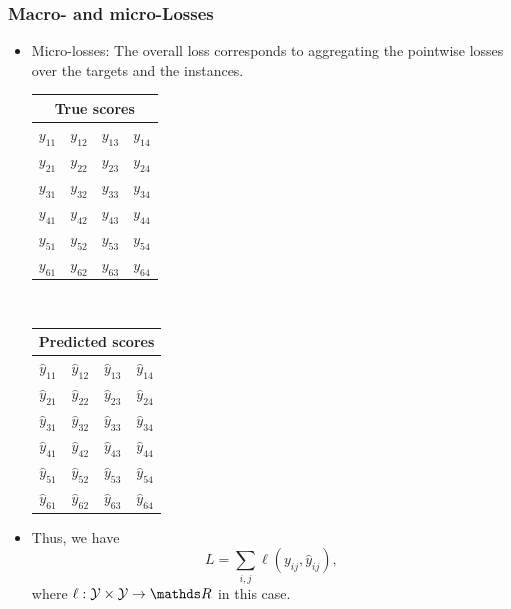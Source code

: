 \documentclass[11pt,compress,t,notes=noshow, xcolor=table]{beamer}
\begin{document}
\begin{frame}
	\frametitle{Macro- and micro-Losses}
	
	\begin{itemize}
		\item<1-> Micro-losses: The overall loss corresponds to aggregating the pointwise losses over the targets and the instances.
		
		\begin{center}
			\begin{tabular}{|c|c|c|c|}
				\multicolumn{4}{c}{True scores} \\
				\hline
				\color{putred}$y_{11}$ & \color{putred}$y_{12}$ & \color{putred}$y_{13}$ & \color{putred}$y_{14}$ \\
				\color{putred}$y_{21}$ & \color{putred}$y_{22}$ & \color{putred}$y_{23}$ & \color{putred}$y_{24}$ \\
				\color{putred}$y_{31}$ & \color{putred}$y_{32}$ & \color{putred}$y_{33}$ & \color{putred}$y_{34}$ \\
				\color{putred}$y_{41}$ & \color{putred}$y_{42}$ & \color{putred}$y_{43}$ & \color{putred}$y_{44}$ \\
				\color{putred}$y_{51}$ & \color{putred}$y_{52}$ & \color{putred}$y_{53}$ & \color{putred}$y_{54}$ \\
				\color{putred}$y_{61}$ & \color{putred}$y_{62}$ & \color{putred}$y_{63}$ & \color{putred}$y_{64}$ \\
				\hline
			\end{tabular}
			$\quad$
			\begin{tabular}{|c|c|c|c|}
				\multicolumn{4}{c}{Predicted scores} \\
				\hline
				\color{putred}$\hat{y}_{11}$ & \color{putred}$\hat{y}_{12}$ & \color{putred}$\hat{y}_{13}$ & \color{putred}$\hat{y}_{14}$ \\
				\color{putred}$\hat{y}_{21}$ & \color{putred}$\hat{y}_{22}$ & \color{putred}$\hat{y}_{23}$ & \color{putred}$\hat{y}_{24}$ \\
				\color{putred}$\hat{y}_{31}$ & \color{putred}$\hat{y}_{32}$ & \color{putred}$\hat{y}_{33}$ & \color{putred}$\hat{y}_{34}$ \\
				\color{putred}$\hat{y}_{41}$ & \color{putred}$\hat{y}_{42}$ & \color{putred}$\hat{y}_{43}$ & \color{putred}$\hat{y}_{44}$ \\
				\color{putred}$\hat{y}_{51}$ & \color{putred}$\hat{y}_{52}$ & \color{putred}$\hat{y}_{53}$ & \color{putred}$\hat{y}_{54}$ \\
				\color{putred}$\hat{y}_{61}$ & \color{putred}$\hat{y}_{62}$ & \color{putred}$\hat{y}_{63}$ & \color{putred}$\hat{y}_{64}$ \\
				\hline
			\end{tabular}
		\end{center}
	\lz
	\item Thus, we have	
	$$
	L =  \sum_{i,j} \ell(y_{ij} , \hat{y}_{ij}),
	$$
	where $\ell: \Yspace \times \Yspace \to \R$ in this case.
%	
	\end{itemize}

\end{frame}
\end{document}
